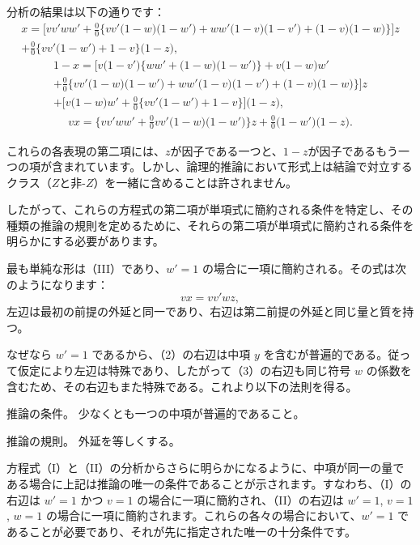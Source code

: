 \documentclass[a4paper,11pt,openany]{ltjsbook}
\begin{document}
分析の結果は以下の通りです：
\begin{multline*}
  \tag{I.}
    x = \bigl[vv'ww' + \frac{0}{0}\{
     vv'\bigl(1-w\bigr) \bigl(1-w'\bigr)
   + ww'\bigl(1-v\bigr) \bigl(1-v'\bigr)
   +    \bigl(1-v\bigr) \bigl(1-w\bigr)\}\bigr]z\\
  + \frac{0}{0}\{vv'\bigl(1-w'\bigr) + 1-v\} \bigl(1-z\bigr),
\end{multline*}
\begin{multline*}
  \tag{II.}
    1-x = \bigl[
     v\bigl(1-v'\bigr) \{ww' + \bigl(1-w\bigr) \bigl(1-w'\bigr)\}
   + v\bigl(1-w\bigr)w'\\
+ \frac{0}{0}\{
     vv'\bigl(1-w\bigr) \bigl(1-w'\bigr)
   + ww'\bigl(1-v\bigr) \bigl(1-v'\bigr)
   + \bigl(1-v\bigr) \bigl(1-w\bigr) \} \bigr]z\\
  +\bigl[v\bigl(1-w\bigr)w'
 + \frac{0}{0}\{vv'\bigl(1-w'\bigr) + 1-v\} \bigr] \bigl(1-z\bigr),
\end{multline*}
\begin{multline*}
  \tag{III.}
    vx = \{vv'ww' + \frac{0}{0}vv'\bigl(1-w\bigr) \bigl(1-w'\bigr)\}z
   + \frac{0}{0}\bigl(1-w'\bigr) \bigl(1-z\bigr).
\end{multline*}

これらの各表現の第二項には、$z$が因子である一つと、$1-z$が因子であるもう一つの項が含まれています。しかし、論理的推論において形式上は結論で対立するクラス（$Z$と非-$Z$）を一緒に含めることは許されません。

したがって、これらの方程式の第二項が単項式に簡約される条件を特定し、その種類の推論の規則を定めるために、それらの第二項が単項式に簡約される条件を明らかにする必要があります。

最も単純な形は（III）であり、$w'=1$ の場合に一項に簡約される。その式は次のようになります：
\[ vx = vv'wz, \]
左辺は最初の前提の外延と同一であり、右辺は第二前提の外延と同じ量と質を持つ。

なぜなら $w'=1$ であるから、（2）の右辺は中項 $y$ を含むが普遍的である。従って仮定により左辺は特殊であり、したがって（3）の右辺も同じ符号 $w$ の係数を含むため、その右辺もまた特殊である。これより以下の法則を得る。

推論の条件。
少なくとも一つの中項が普遍的であること。

推論の規則。
外延を等しくする。

方程式（I）と（II）の分析からさらに明らかになるように、中項が同一の量である場合に上記は推論の唯一の条件であることが示されます。すなわち、（I）の右辺は $w'=1$ かつ $v=1$ の場合に一項に簡約され、（II）の右辺は $w'=1$, $v=1$, $w=1$ の場合に一項に簡約されます。これらの各々の場合において、$w'=1$ であることが必要であり、それが先に指定された唯一の十分条件です。
\end{document}
